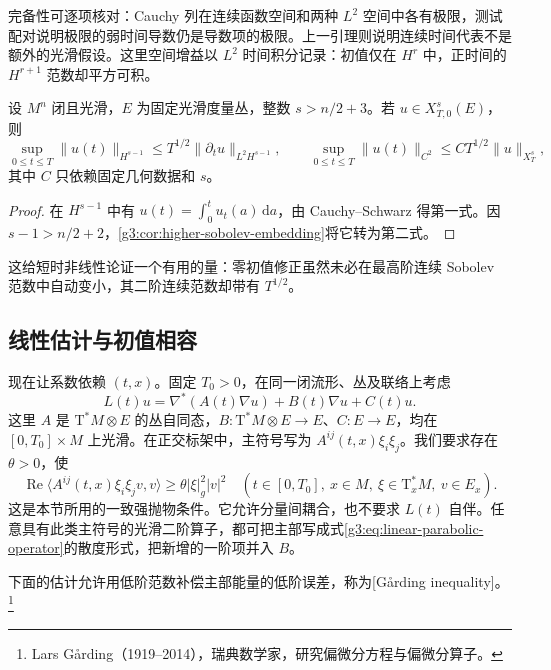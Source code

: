 完备性可逐项核对：Cauchy 列在连续函数空间和两种 \(L^2\) 空间中各有极限，测试配对说明极限的弱时间导数仍是导数项的极限。上一引理则说明连续时间代表不是额外的光滑假设。这里空间增益以 \(L^2\) 时间积分记录：初值仅在 \(H^r\) 中，正时间的 \(H^{r+1}\) 范数却平方可积。

\begin{proposition}\label{g3:prop:parabolic-zero-trace-small-time}
	设 \(M^n\) 闭且光滑，\(E\) 为固定光滑度量丛，整数 \(s>n/2+3\)。若 \(u\in X_{T,0}^s(E)\)，则
	\[
		\sup_{0\le t\le T}\|u(t)\|_{H^{s-1}}
		\le T^{1/2}\|\partial_tu\|_{L^2H^{s-1}},
		\qquad
		\sup_{0\le t\le T}\|u(t)\|_{C^2}
		\le C T^{1/2}\|u\|_{X_T^s},
	\]
	其中 \(C\) 只依赖固定几何数据和 \(s\)。
\end{proposition}
\begin{proof}
	在 \(H^{s-1}\) 中有 \(u(t)=\int_0^t u_t(a)\,\mathrm da\)，由 Cauchy--Schwarz 得第一式。因 \(s-1>n/2+2\)，\cref{g3:cor:higher-sobolev-embedding}将它转为第二式。
\end{proof}

这给短时非线性论证一个有用的量：零初值修正虽然未必在最高阶连续 Sobolev 范数中自动变小，其二阶连续范数却带有 \(T^{1/2}\)。

\subsection{线性估计与初值相容}
\label{g3:subsec:2601:03}
现在让系数依赖 \((t,x)\)。固定 \(T_0>0\)，在同一闭流形、丛及联络上考虑
\begin{equation}\label{g3:eq:linear-parabolic-operator}
	L(t)u=\nabla^*(A(t)\nabla u)+B(t)\nabla u+C(t)u.
\end{equation}
这里 \(A\) 是 \(\mathrm T^*M\otimes E\) 的丛自同态，\(B:\mathrm T^*M\otimes E\to E\)、\(C:E\to E\)，均在 \([0,T_0]\times M\) 上光滑。在正交标架中，主符号写为 \(A^{ij}(t,x)\xi_i\xi_j\)。我们要求存在 \(\theta>0\)，使
\begin{equation}\label{g3:eq:linear-strong-parabolicity}
	\operatorname{Re}\langle A^{ij}(t,x)\xi_i\xi_jv,v\rangle
	\ge\theta|\xi|_g^2|v|^2
	\quad(t\in[0,T_0],\ x\in M,\ \xi\in\mathrm T_x^*M,\ v\in E_x).
\end{equation}
这是本节所用的一致强抛物条件。它允许分量间耦合，也不要求 \(L(t)\) 自伴。任意具有此类主符号的光滑二阶算子，都可把主部写成式\eqref{g3:eq:linear-parabolic-operator}的散度形式，把新增的一阶项并入 \(B\)。

\ProseParagraphBreak
下面的估计允许用低阶范数补偿主部能量的低阶误差，称为[Gårding inequality]。\footnote{Lars Gårding（1919--2014），瑞典数学家，研究偏微分方程与偏微分算子。}

